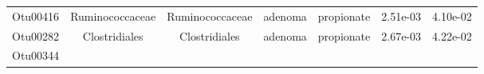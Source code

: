 \documentclass[11pt,]{article}
\begin{document}
\begin{longtable}[]{@{}ccccccc@{}}
\begin{minipage}[t]{0.09\columnwidth}\centering\strut
Otu00416\strut
\end{minipage} & \begin{minipage}[t]{0.17\columnwidth}\centering\strut
Ruminococcaceae\strut
\end{minipage} & \begin{minipage}[t]{0.17\columnwidth}\centering\strut
Ruminococcaceae\strut
\end{minipage} & \begin{minipage}[t]{0.09\columnwidth}\centering\strut
adenoma\strut
\end{minipage} & \begin{minipage}[t]{0.11\columnwidth}\centering\strut
propionate\strut
\end{minipage} & \begin{minipage}[t]{0.09\columnwidth}\centering\strut
2.51e-03\strut
\end{minipage} & \begin{minipage}[t]{0.09\columnwidth}\centering\strut
4.10e-02\strut
\end{minipage}\tabularnewline
\begin{minipage}[t]{0.09\columnwidth}\centering\strut
Otu00282\strut
\end{minipage} & \begin{minipage}[t]{0.17\columnwidth}\centering\strut
Clostridiales\strut
\end{minipage} & \begin{minipage}[t]{0.17\columnwidth}\centering\strut
Clostridiales\strut
\end{minipage} & \begin{minipage}[t]{0.09\columnwidth}\centering\strut
adenoma\strut
\end{minipage} & \begin{minipage}[t]{0.11\columnwidth}\centering\strut
propionate\strut
\end{minipage} & \begin{minipage}[t]{0.09\columnwidth}\centering\strut
2.67e-03\strut
\end{minipage} & \begin{minipage}[t]{0.09\columnwidth}\centering\strut
4.22e-02\strut
\end{minipage}\tabularnewline
\begin{minipage}[t]{0.09\columnwidth}\centering\strut
Otu00344\strut
\end{minipage} & \begin{minipage}[t]{0.17\columnwidth}\centering\strut

\end{minipage}
\end{longtable}
\end{document}
